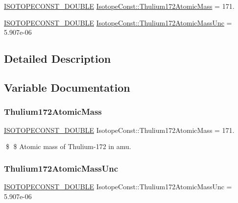 \begin{DoxyCompactItemize}
\item 
\mbox{\hyperlink{group___isotope_const-_macros_ga8f45a7272ce02c0b4c65c44636ed719a}{I\+S\+O\+T\+O\+P\+E\+C\+O\+N\+S\+T\+\_\+\+D\+O\+U\+B\+LE}} \mbox{\hyperlink{group___isotope_const-_thulium-_tm172_gad510c1089588c05c12da9345092d1c36}{Isotope\+Const\+::\+Thulium172\+Atomic\+Mass}} = 171.
\item 
\mbox{\hyperlink{group___isotope_const-_macros_ga8f45a7272ce02c0b4c65c44636ed719a}{I\+S\+O\+T\+O\+P\+E\+C\+O\+N\+S\+T\+\_\+\+D\+O\+U\+B\+LE}} \mbox{\hyperlink{group___isotope_const-_thulium-_tm172_ga1132b2790d1c73bbda7ace24da8daee9}{Isotope\+Const\+::\+Thulium172\+Atomic\+Mass\+Unc}} = 5.\+907e-\/06
\end{DoxyCompactItemize}


\subsection{Detailed Description}


\subsection{Variable Documentation}
\mbox{\label{group___isotope_const-_thulium-_tm172_gad510c1089588c05c12da9345092d1c36}} 
\subsubsection{\texorpdfstring{Thulium172\+Atomic\+Mass}{Thulium172AtomicMass}}
{\footnotesize\ttfamily \mbox{\hyperlink{group___isotope_const-_macros_ga8f45a7272ce02c0b4c65c44636ed719a}{I\+S\+O\+T\+O\+P\+E\+C\+O\+N\+S\+T\+\_\+\+D\+O\+U\+B\+LE}} Isotope\+Const\+::\+Thulium172\+Atomic\+Mass = 171.}

\$ \$ Atomic mass of Thulium-\/172 in amu. \mbox{\label{group___isotope_const-_thulium-_tm172_ga1132b2790d1c73bbda7ace24da8daee9}} 
\subsubsection{\texorpdfstring{Thulium172\+Atomic\+Mass\+Unc}{Thulium172AtomicMassUnc}}
{\footnotesize\ttfamily \mbox{\hyperlink{group___isotope_const-_macros_ga8f45a7272ce02c0b4c65c44636ed719a}{I\+S\+O\+T\+O\+P\+E\+C\+O\+N\+S\+T\+\_\+\+D\+O\+U\+B\+LE}} Isotope\+Const\+::\+Thulium172\+Atomic\+Mass\+Unc = 5.\+907e-\/06}

